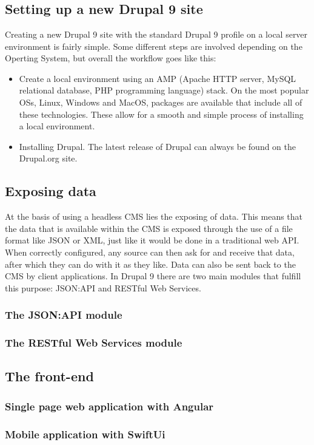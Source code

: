 
\chapter{}
\label{ch:proofofconcept}

\section{Setting up a new Drupal 9 site}

Creating a new Drupal 9 site with the standard Drupal 9 profile on a local server environment is fairly simple. Some different steps are involved depending on the Operting System, but overall the workflow goes like this: 
\begin{itemize}
	\item Create a local environment using an AMP (Apache HTTP server, MySQL relational database, PHP programming language) stack. On the most popular OSs, Linux, Windows and MacOS, packages are available that include all of these technologies. These allow for a smooth and simple process of installing a local environment.
	\item Installing Drupal. The latest release of Drupal can always be found on the Drupal.org site.
\end{itemize}

\section{Exposing data}

At the basis of using a headless CMS lies the exposing of data. This means that the data that is available within the CMS is exposed through the use of a file format like JSON or XML, just like it would be done in a traditional web API. When correctly configured, any source can then ask for and receive that data, after which they can do with it as they like. Data can also be sent back to the CMS by client applications. In Drupal 9 there are two main modules that fulfill this purpose: JSON:API and RESTful Web Services.

\subsection{The JSON:API module}

\subsection{The  RESTful Web Services module}

\section{The front-end}

\subsection{Single page web application with Angular}

\subsection{Mobile application with SwiftUi}